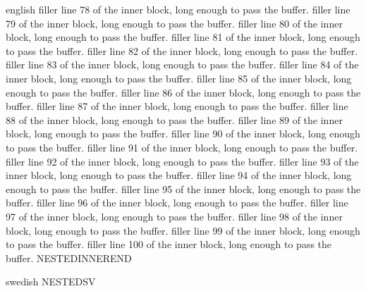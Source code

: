 \begin{onlyin}{english}
filler line 78 of the inner block, long enough to pass the buffer.
filler line 79 of the inner block, long enough to pass the buffer.
filler line 80 of the inner block, long enough to pass the buffer.
filler line 81 of the inner block, long enough to pass the buffer.
filler line 82 of the inner block, long enough to pass the buffer.
filler line 83 of the inner block, long enough to pass the buffer.
filler line 84 of the inner block, long enough to pass the buffer.
filler line 85 of the inner block, long enough to pass the buffer.
filler line 86 of the inner block, long enough to pass the buffer.
filler line 87 of the inner block, long enough to pass the buffer.
filler line 88 of the inner block, long enough to pass the buffer.
filler line 89 of the inner block, long enough to pass the buffer.
filler line 90 of the inner block, long enough to pass the buffer.
filler line 91 of the inner block, long enough to pass the buffer.
filler line 92 of the inner block, long enough to pass the buffer.
filler line 93 of the inner block, long enough to pass the buffer.
filler line 94 of the inner block, long enough to pass the buffer.
filler line 95 of the inner block, long enough to pass the buffer.
filler line 96 of the inner block, long enough to pass the buffer.
filler line 97 of the inner block, long enough to pass the buffer.
filler line 98 of the inner block, long enough to pass the buffer.
filler line 99 of the inner block, long enough to pass the buffer.
filler line 100 of the inner block, long enough to pass the buffer.
NESTEDINNEREND
\end{onlyin}
\begin{onlyin}{swedish}
NESTEDSV
\end{onlyin}
